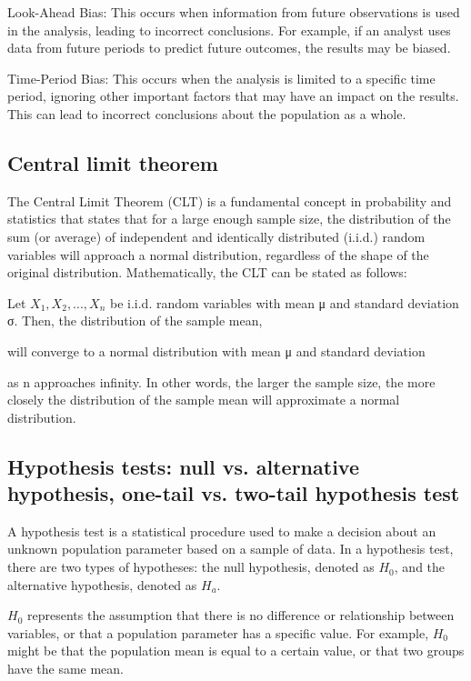\documentclass[12pt, a4paper, oneside]{article}
\begin{document}
Look-Ahead Bias: This occurs when information from future observations is used in the analysis, leading to incorrect conclusions. For example, if an analyst uses data from future periods to predict future outcomes, the results may be biased.

Time-Period Bias: This occurs when the analysis is limited to a specific time period, ignoring other important factors that may have an impact on the results. This can lead to incorrect conclusions about the population as a whole.






\subsection{ Central limit theorem }
The Central Limit Theorem (CLT) is a fundamental concept in probability and statistics that states that for a large enough sample size, the distribution of the sum (or average) of independent and identically distributed (i.i.d.) random variables will approach a normal distribution, regardless of the shape of the original distribution. Mathematically, the CLT can be stated as follows:

Let $X_1, X_2, ..., X_n$ be i.i.d. random variables with mean μ and standard deviation σ. Then, the distribution of the sample mean,


will converge to a normal distribution with mean μ and standard deviation


as n approaches infinity. In other words, the larger the sample size, the more closely the distribution of the sample mean will approximate a normal distribution.

\subsection{ Hypothesis tests: null vs. alternative hypothesis, one-tail vs. two-tail hypothesis test }
A hypothesis test is a statistical procedure used to make a decision about an unknown population parameter based on a sample of data. In a hypothesis test, there are two types of hypotheses: the null hypothesis, denoted as $H_0$, and the alternative hypothesis, denoted as $H_a$.

$H_0$ represents the assumption that there is no difference or relationship between variables, or that a population parameter has a specific value. For example, $H_0$ might be that the population mean is equal to a certain value, or that two groups have the same mean.
\end{document}
